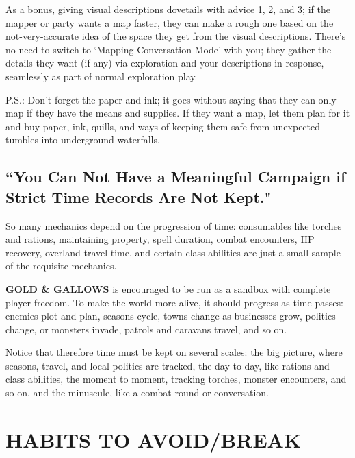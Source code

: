 \documentclass[twoside]{article}
\begin{document}
\bigbreak

As a bonus, giving visual descriptions dovetails with advice 1, 2, and 3; if the mapper or party wants a map faster, they can make a rough one based on the not-very-accurate idea of the space they get from the visual descriptions. There's no need to switch to `Mapping Conversation Mode' with you; they gather the details they want (if any) via exploration and your descriptions in response, seamlessly as part of normal exploration play.

\bigbreak

P.S.: Don't forget the paper and ink; it goes without saying that they can only map if they have the means and supplies. If they want a map, let them plan for it and buy paper, ink, quills, and ways of keeping them safe from unexpected tumbles into underground waterfalls.

\subsection*{``You Can Not Have a Meaningful Campaign if Strict Time Records Are Not Kept."}

So many mechanics depend on the progression of time: consumables like torches and rations, maintaining property, spell duration, combat encounters, HP recovery, overland travel time, and certain class abilities are just a small sample of the requisite mechanics.

\bigbreak

\textbf{GOLD \& GALLOWS} is encouraged to be run as a sandbox with complete player freedom. To make the world more alive, it should progress as time passes: enemies plot and plan, seasons cycle, towns change as businesses grow, politics change, or monsters invade, patrols and caravans travel, and so on.

\bigbreak

Notice that therefore time must be kept on several scales: the big picture, where seasons, travel, and local politics are tracked, the day-to-day, like rations and class abilities, the moment to moment, tracking torches, monster encounters, and so on, and the minuscule, like a combat round or conversation.

\section*{HABITS TO AVOID/BREAK}
\end{document}
